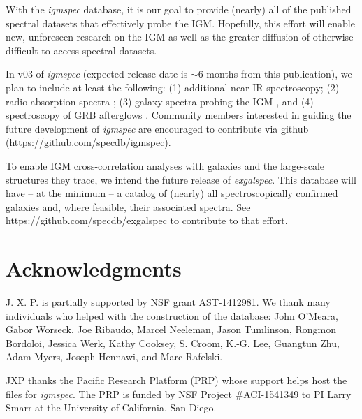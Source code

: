 \documentclass[12pt]{elsarticle}
\begin{document}
With the {\it igmspec} database, it is our goal to provide (nearly)
all of the published spectral datasets that effectively
probe the IGM.  Hopefully, this effort will
enable new, unforeseen research on the IGM as well
as the greater diffusion of otherwise difficult-to-access spectral
datasets.  

In v03 of
{\it igmspec} (expected release date is $\sim 6$ months from
this publication), we plan to include at least the following:
(1) additional near-IR spectroscopy;
(2) radio absorption spectra \citep[e.g. 21\,cm;][]{kanekar+14};
(3) galaxy spectra probing the IGM \citep[e.g.][]{rpk+10}, 
and
(4) spectroscopy of GRB afterglows \citep[e.g.][]{fjp+09}.
Community members interested in guiding the future development
of {\it igmspec} are encouraged to contribute via github
(https://github.com/specdb/igmspec).

To enable IGM cross-correlation analyses with galaxies
and the large-scale structures they trace,
we intend the future release of {\it exgalspec}.
This database will have -- at
the minimum -- a catalog of (nearly) all spectroscopically
confirmed galaxies and, where feasible, their associated
spectra.  See https://github.com/specdb/exgalspec
to contribute to that effort.


\section{Acknowledgments}

J. X. P. is partially supported by NSF grant AST-1412981.
We thank many individuals who helped with the construction
of the database:
John O'Meara, Gabor Worseck, Joe Ribaudo, Marcel Neeleman,
Jason Tumlinson, Rongmon Bordoloi, Jessica Werk,
Kathy Cooksey, S. Croom, K.-G. Lee, Guangtun Zhu,
Adam Myers, Joseph Hennawi,  and Marc Rafelski.

JXP thanks the Pacific Research Platform (PRP) whose support
helps host the files for {\it igmspec}.  The PRP is funded by
NSF Project \#ACI-1541349 to
PI Larry Smarr at the University of California, San Diego.



%
%
%
\end{document}
